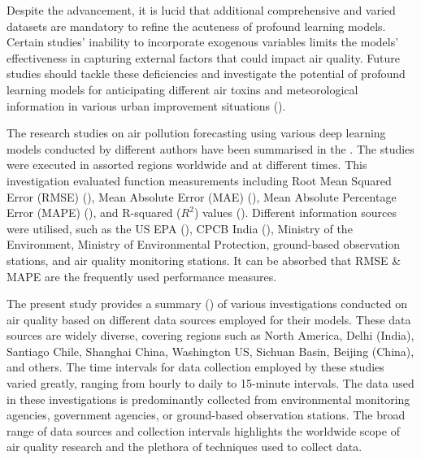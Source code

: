 \documentclass[a4paper, fleqn]{cas-sc}
\theoremstyle{definition}
\theoremstyle{remark}
\begin{document}
Despite the advancement,  it is lucid that additional comprehensive and varied datasets are mandatory to refine the acuteness of profound learning models. Certain studies' inability to incorporate exogenous variables limits the models' effectiveness in capturing external factors that could impact air quality. Future studies should tackle these deficiencies and investigate the potential of profound learning models for anticipating different air toxins and meteorological information in various urban improvement situations (\cite{samal2021multi}).

The research studies on air pollution forecasting using various deep learning models conducted by different authors have been summarised in the . The studies were executed in assorted regions worldwide and at different times. This investigation evaluated function measurements including Root Mean Squared Error (RMSE) (\cite{das2022prediction, kurnaz2022prediction, samal2021multi, kim2022short, zhu2023investigation, menares2021forecasting, nath2021long, du2019deep, li2017long, qin2019novel, ma2019improving, natsagdorj2023prediction}),  Mean Absolute Error (MAE) (\cite{li2023nested, menares2021forecasting, zhu2023investigation, ma2019improving, nath2021long, du2019deep, li2017long}),  Mean Absolute Percentage Error (MAPE) (\cite{li2017long, ma2019improving}),  and R-squared ($R^2$) values (\cite{eren2023predicting, lee2021potential, kim2022short, zhu2023investigation, menares2021forecasting}). Different information sources were utilised,  such as the US EPA (\cite{li2023nested}),  CPCB India (\cite{nath2021long, samal2021multi, pruthi2022low}),  Ministry of the Environment,  Ministry of Environmental Protection,  ground-based observation stations,  and air quality monitoring stations. It can be absorbed that RMSE \& MAPE are the frequently used performance measures.
 
The present study provides a summary () of various investigations conducted on air quality based on different data sources employed for their models. These data sources are widely diverse, covering regions such as North America, Delhi (India), Santiago Chile, Shanghai China, Washington US, Sichuan Basin, Beijing (China), and others. The time intervals for data collection employed by these studies varied greatly, ranging from hourly to daily to 15-minute intervals. The data used in these investigations is predominantly collected from environmental monitoring agencies, government agencies, or ground-based observation stations. The broad range of data sources and collection intervals highlights the worldwide scope of air quality research and the plethora of techniques used to collect data.
\end{document}
